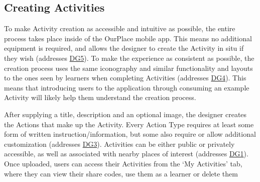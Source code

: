\subsection{Creating Activities}

To make Activity creation as accessible and intuitive as possible, the entire process takes place inside of the OurPlace mobile app. This means no additional equipment is required, and allows the designer to create the Activity in situ if they wish (addresses \hyperref[DG5]{DG5}). To make the experience as consistent as possible, the creation process uses the same iconography and similar functionality and layouts to the ones seen by learners when completing Activities (addresses \hyperref[DG4]{DG4}). This means that introducing users to the application through consuming an example Activity will likely help them understand the creation process. 



After supplying a title, description and an optional image, the designer creates the Actions that make up the Activity. Every Action Type requires at least some form of written instruction/information, but some also require or allow additional customization (addresses \hyperref[DG3]{DG3}). Activities can be either public or privately accessible, as well as associated with nearby places of interest (addresses \hyperref[DG1]{DG1}). Once uploaded, users can access their Activities from the ‘My Activities’ tab, where they can view their share codes, use them as a learner or delete them

